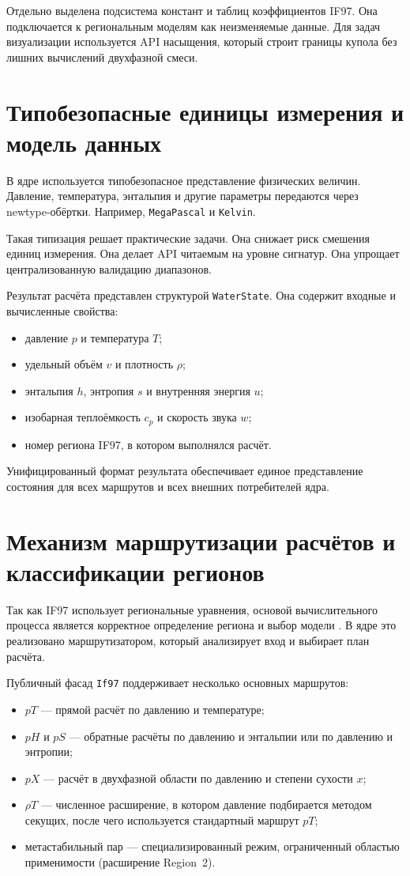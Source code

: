Отдельно выделена подсистема констант и таблиц коэффициентов IF97.
Она подключается к региональным моделям как неизменяемые данные.
Для задач визуализации используется API насыщения,
который строит границы купола без лишних вычислений двухфазной смеси.

\section{Типобезопасные единицы измерения и модель данных}

В ядре используется типобезопасное представление физических величин.
Давление, температура, энтальпия и другие параметры
передаются через newtype-обёртки.
Например, \texttt{MegaPascal} и \texttt{Kelvin}.

Такая типизация решает практические задачи.
Она снижает риск смешения единиц измерения.
Она делает API читаемым на уровне сигнатур.
Она упрощает централизованную валидацию диапазонов.

Результат расчёта представлен структурой \texttt{WaterState}.
Она содержит входные и вычисленные свойства:
\begin{itemize}
\item давление $p$ и температура $T$;  
\item удельный объём $v$ и плотность $\rho$;  
\item энтальпия $h$, энтропия $s$ и внутренняя энергия $u$;  
\item изобарная теплоёмкость $c_p$ и скорость звука $w$;  
\item номер региона IF97, в котором выполнялся расчёт.  
\end{itemize}

Унифицированный формат результата
обеспечивает единое представление состояния
для всех маршрутов и всех внешних потребителей ядра.

\section{Механизм маршрутизации расчётов и классификации регионов}

Так как IF97 использует региональные уравнения,
основой вычислительного процесса является
корректное определение региона и выбор модели
\cite{iapws_if97_2012}.
В ядре это реализовано маршрутизатором,
который анализирует вход и выбирает план расчёта.

Публичный фасад \texttt{If97} поддерживает несколько основных маршрутов:
\begin{itemize}
\item $pT$ --- прямой расчёт по давлению и температуре;  
\item $pH$ и $pS$ --- обратные расчёты по давлению и энтальпии или по давлению и энтропии;  
\item $pX$ --- расчёт в двухфазной области по давлению и степени сухости $x$;  
\item $\rho T$ --- численное расширение, в котором давление подбирается методом секущих, после чего используется стандартный маршрут $pT$;  
\item метастабильный пар --- специализированный режим, ограниченный областью применимости (расширение Region~2).  
\end{itemize}

